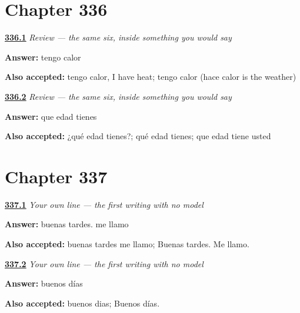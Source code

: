 \section*{Chapter 336}

\noindent\begin{minipage}[t]{\linewidth}
\raggedright
\hyperlink{review-ES-C336-repaso-seis-en-uso-calor}{\textbf{336.1}} \emph{Review --- the same six, inside something you would say}\par
\small \textbf{Answer:} tengo calor\par
\footnotesize \textbf{Also accepted:} tengo calor, I have heat; tengo calor (hace calor is the weather)
\end{minipage}\par\medskip

\noindent\begin{minipage}[t]{\linewidth}
\raggedright
\hyperlink{review-ES-C336-repaso-seis-en-uso-edad}{\textbf{336.2}} \emph{Review --- the same six, inside something you would say}\par
\small \textbf{Answer:} que edad tienes\par
\footnotesize \textbf{Also accepted:} ¿qué edad tienes?; qué edad tienes; que edad tiene usted
\end{minipage}\par\medskip

\section*{Chapter 337}

\noindent\begin{minipage}[t]{\linewidth}
\raggedright
\hyperlink{review-ES-W01-frase-propia-afternoon}{\textbf{337.1}} \emph{Your own line — the first writing with no model}\par
\small \textbf{Answer:} buenas tardes. me llamo\par
\footnotesize \textbf{Also accepted:} buenas tardes me llamo; Buenas tardes. Me llamo.
\end{minipage}\par\medskip

\noindent\begin{minipage}[t]{\linewidth}
\raggedright
\hyperlink{review-ES-W01-frase-propia-morning}{\textbf{337.2}} \emph{Your own line — the first writing with no model}\par
\small \textbf{Answer:} buenos días\par
\footnotesize \textbf{Also accepted:} buenos dias; Buenos días.
\end{minipage}\par\medskip

